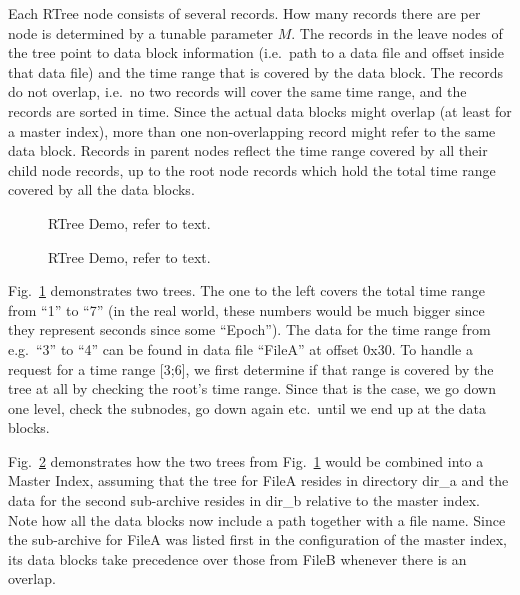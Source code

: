 Each RTree node consists of several records. How many records there are
per node is determined by a tunable parameter $M$.
The records in the leave nodes of the tree point to data block
information (i.e.\ path to a data file and offset inside that data
file) and the time range that is covered by the data block.
The records do not overlap, i.e.\ no two records will cover the same
time range, and the records are sorted in time.
Since the actual data blocks might overlap (at least for a master index), more
than one non-overlapping record might refer to the same data block.
Records in parent nodes reflect the time range covered by all their
child node records, up to the root node records which hold the total
time range covered by all the data blocks.

\begin{figure}[htb]
\begin{center}
\end{center}
\caption{\label{fig:indices}RTree Demo, refer to text.}
\end{figure}

\begin{figure}[htb]
\begin{center}
\end{center}
\caption{\label{fig:masterindex}RTree Demo, refer to text.}
\end{figure}

Fig.~\ref{fig:indices} demonstrates two trees. The one to the left
covers the total time range from ``1'' to ``7'' (in the real world,
these numbers would be much bigger since they represent seconds since
some ``Epoch'').  The data for the time range from e.g.\ ``3'' to
``4'' can be found in data file ``FileA'' at offset 0x30. To handle a
request for a time range [3;6], we first determine if that range is
covered by the tree at all by checking the root's time range. Since
that is the case, we go down one level, check the subnodes, go down
again etc.\ until we end up at the data blocks.

Fig.~\ref{fig:masterindex} demonstrates how the two trees from
Fig.~\ref{fig:indices} would be combined into a Master Index, assuming
that the tree for FileA resides in directory dir\_a and the data for
the second sub-archive resides in dir\_b relative to the master index.
Note how all the data blocks now include a path together with a file
name. Since the sub-archive for FileA was listed first in the
configuration of the master index, its data blocks take precedence
over those from FileB whenever there is an overlap.

